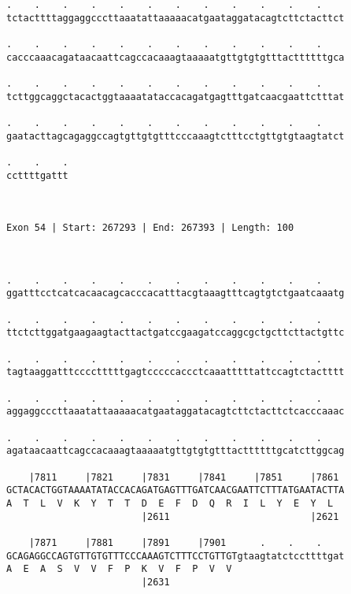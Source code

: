 \documentclass{article}
\begin{document}
\begin{Verbatim}
.    .    .    .    .    .    .    .    .    .    .    .    
tctacttttaggaggcccttaaatattaaaaacatgaataggatacagtcttctacttct
                                                            
.    .    .    .    .    .    .    .    .    .    .    .    
cacccaaacagataacaattcagccacaaagtaaaaatgttgtgtgtttacttttttgca
                                                            
.    .    .    .    .    .    .    .    .    .    .    .    
tcttggcaggctacactggtaaaatataccacagatgagtttgatcaacgaattctttat
                                                            
.    .    .    .    .    .    .    .    .    .    .    .    
gaatacttagcagaggccagtgttgtgtttcccaaagtctttcctgttgtgtaagtatct
                                                            
.    .    .
ccttttgattt
           
           
 
Exon 54 | Start: 267293 | End: 267393 | Length: 100



.    .    .    .    .    .    .    .    .    .    .    .    
ggatttcctcatcacaacagcacccacatttacgtaaagtttcagtgtctgaatcaaatg
                                                            
.    .    .    .    .    .    .    .    .    .    .    .    
ttctcttggatgaagaagtacttactgatccgaagatccaggcgctgcttcttactgttc
                                                            
.    .    .    .    .    .    .    .    .    .    .    .    
tagtaaggatttcccctttttgagtcccccaccctcaaatttttattccagtctactttt
                                                            
.    .    .    .    .    .    .    .    .    .    .    .    
aggaggcccttaaatattaaaaacatgaataggatacagtcttctacttctcacccaaac
                                                            
.    .    .    .    .    .    .    .    .    .    .    .    
agataacaattcagccacaaagtaaaaatgttgtgtgtttacttttttgcatcttggcag
                                                            
    |7811     |7821     |7831     |7841     |7851     |7861 
GCTACACTGGTAAAATATACCACAGATGAGTTTGATCAACGAATTCTTTATGAATACTTA
A  T  L  V  K  Y  T  T  D  E  F  D  Q  R  I  L  Y  E  Y  L  
                        |2611                         |2621 
  
    |7871     |7881     |7891     |7901      .    .    .    
GCAGAGGCCAGTGTTGTGTTTCCCAAAGTCTTTCCTGTTGTgtaagtatctccttttgat
A  E  A  S  V  V  F  P  K  V  F  P  V  V                    
                        |2631                               
  

\end{Verbatim}
\end{document}
